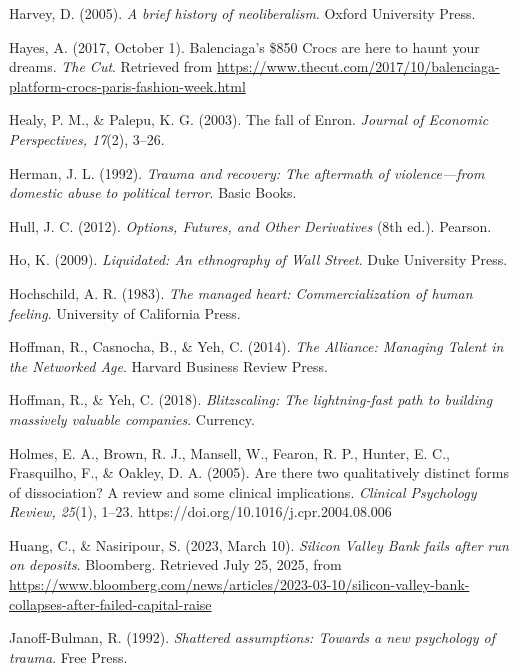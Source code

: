 \begin{thebibliography}{}
    Harvey, D. (2005). \textit{A brief history of neoliberalism}. Oxford University Press.

    Hayes, A. (2017, October 1). Balenciaga’s \$850 Crocs are here to haunt your dreams. \textit{The Cut}. Retrieved from \url{https://www.thecut.com/2017/10/balenciaga-platform-crocs-paris-fashion-week.html}

    Healy, P. M., \& Palepu, K. G. (2003). The fall of Enron. \textit{Journal of Economic Perspectives, 17}(2), 3–26.

    Herman, J. L. (1992). \textit{Trauma and recovery: The aftermath of violence—from domestic abuse to political terror}. Basic Books.

    Hull, J. C. (2012). \textit{Options, Futures, and Other Derivatives} (8th ed.). Pearson.

    Ho, K. (2009). \textit{Liquidated: An ethnography of Wall Street}. Duke University Press.

    Hochschild, A. R. (1983). \textit{The managed heart: Commercialization of human feeling}. University of California Press.

    Hoffman, R., Casnocha, B., \& Yeh, C. (2014). \textit{The Alliance: Managing Talent in the Networked Age}. Harvard Business Review Press.

    Hoffman, R., \& Yeh, C. (2018). \textit{Blitzscaling: The lightning-fast path to building massively valuable companies}. Currency.

    Holmes, E. A., Brown, R. J., Mansell, W., Fearon, R. P., Hunter, E. C., Frasquilho, F., \& Oakley, D. A. (2005). Are there two qualitatively distinct forms of dissociation? A review and some clinical implications. \textit{Clinical Psychology Review, 25}(1), 1–23. https://doi.org/10.1016/j.cpr.2004.08.006

    Huang, C., \& Nasiripour, S. (2023, March 10). \textit{Silicon Valley Bank fails after run on deposits}. Bloomberg. Retrieved July 25, 2025, from \url{https://www.bloomberg.com/news/articles/2023-03-10/silicon-valley-bank-collapses-after-failed-capital-raise}



    Janoff-Bulman, R. (1992). \textit{Shattered assumptions: Towards a new psychology of trauma}. Free Press.


\end{thebibliography}
